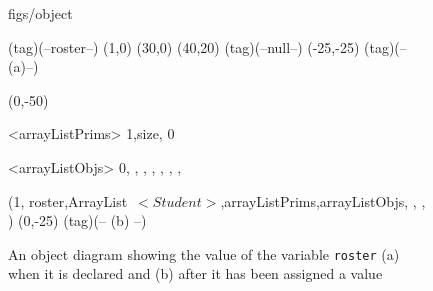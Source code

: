 





\begin {figure}


\Draw

 {figs/object}

\Node(tag)(--roster--)
\MoveToExit(1,0)
\Move(30,0)
\MinNodeSize(40,20)
\ORectNode(tag)(--null--)
\Move (-25,-25)
\Node(tag)(--(a)--)

\Move (0,-50)

\Indirect \Table <arrayListPrims>
{1,size, 0}


\Indirect \Table <arrayListObjs>
 {  0, , , , , , , }
  


\Obj (1, roster,ArrayList~$<Student>$,arrayListPrims,arrayListObjs, , , )
\Move(0,-25)
\Node(tag)(-- (b) --)
    
\EndDraw

\caption {An object diagram showing the value of the
variable \texttt {roster} (a) when it is declared and
(b) after it has been assigned a value}

\label {fig:newArrayList}

\end {figure}



